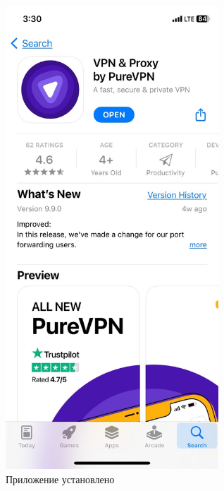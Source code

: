 \begin{itemize}
\begin{figure}[H]
\includegraphics[width=8cm]{44.png}
\centering
\caption{Приложение установлено}
\label{fig:58}
\end{figure}
\end{itemize}

